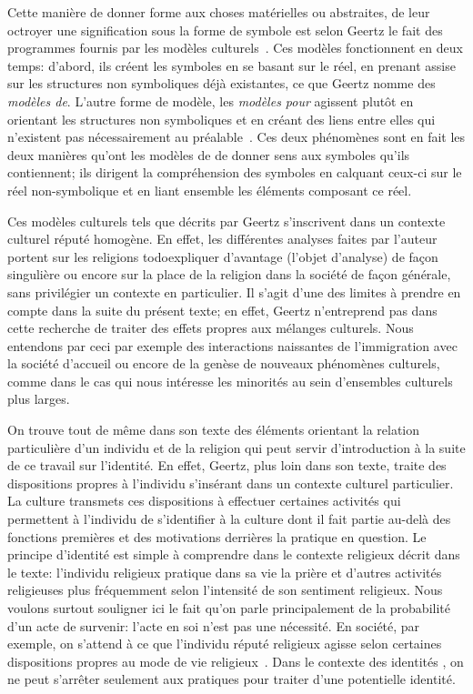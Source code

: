 Cette manière de donner forme aux choses matérielles ou abstraites, de leur octroyer une signification sous la forme de symbole est selon Geertz le fait des programmes fournis par les modèles culturels~\citep[25]{Geertz1972}. 
Ces modèles fonctionnent en deux temps: d'abord, ils créent les symboles en se basant sur le réel, en prenant assise sur les structures non symboliques déjà existantes, ce que Geertz nomme des \emph{modèles de}. 
L'autre forme de modèle, les \emph{modèles pour} agissent plutôt en orientant les structures non symboliques et en créant des liens entre elles qui n'existent pas nécessairement au préalable~\citep[26--27]{Geertz1972}. 
Ces deux phénomènes sont en fait les deux manières qu'ont les modèles de de donner sens aux symboles qu'ils contiennent; ils dirigent la compréhension des symboles en calquant ceux-ci sur le réel non-symbolique et en liant ensemble les éléments composant ce réel.

Ces modèles culturels  tels que décrits par Geertz s'inscrivent dans un contexte culturel réputé homogène. 
En effet, les différentes analyses faites par l'auteur portent sur les religions todo{expliquer d'avantage} (l'objet d'analyse) de façon singulière ou encore sur la place de la religion dans la société de façon générale, sans privilégier un contexte en particulier. 
Il s'agit d'une des limites à prendre en compte dans la suite du présent texte; en effet, Geertz n'entreprend pas dans cette recherche de traiter des effets propres aux mélanges culturels.
Nous entendons par ceci par exemple des interactions naissantes de l'immigration avec la société d'accueil ou encore de la genèse de nouveaux phénomènes culturels, comme dans le cas qui nous intéresse les minorités \lgbt{} au sein d'ensembles culturels plus larges.

On trouve tout de même dans son texte des éléments orientant la relation particulière d'un individu et de la religion qui peut servir d'introduction à la suite de ce travail sur l'identité. 
En effet, Geertz, plus loin dans son texte, traite des dispositions propres à l'individu s'insérant dans un contexte culturel particulier. 
La culture transmets ces dispositions à effectuer certaines activités qui permettent à l'individu de s'identifier à la culture dont il fait partie au-delà des fonctions premières et des motivations derrières la pratique en question. 
Le principe d'identité est simple à comprendre dans le contexte religieux décrit dans le texte: l'individu religieux pratique dans sa vie la prière et d'autres activités religieuses plus fréquemment selon l'intensité de son sentiment religieux. 
Nous voulons surtout souligner ici le fait qu'on parle principalement de la probabilité d'un acte de survenir: l'acte en soi n'est pas une nécessité. 
En société, par exemple, on s'attend à ce que l'individu réputé religieux agisse selon certaines dispositions propres au mode de vie religieux~\citep[28--30]{Geertz1972}. 
Dans le contexte des identités \lgbt{}, on ne peut s'arrêter seulement aux pratiques pour traiter d'une potentielle identité.

